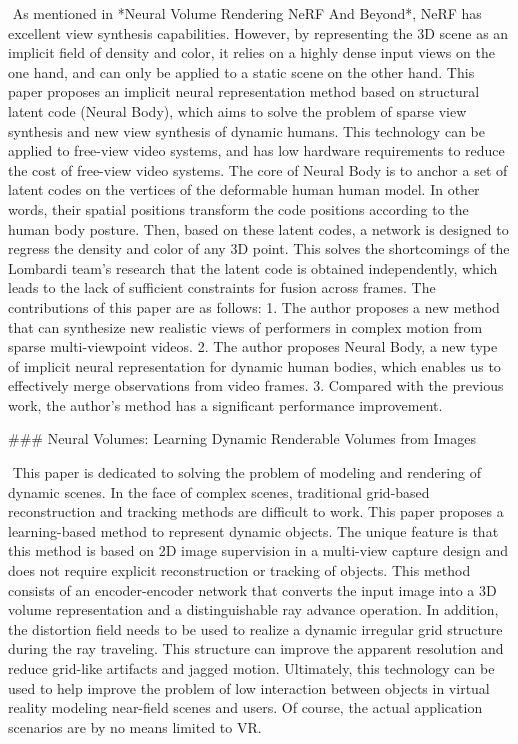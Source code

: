 ​	As mentioned in *Neural Volume Rendering NeRF And Beyond*, NeRF has excellent view synthesis capabilities. However, by representing the 3D scene as an implicit field of density and color, it relies on a highly dense input views on the one hand, and can only be applied to a static scene on the other hand. This paper proposes an implicit neural representation method based on structural latent code (Neural Body), which aims to solve the problem of sparse view synthesis and new view synthesis of dynamic humans. This technology can be applied to free-view video systems, and has low hardware requirements to reduce the cost of free-view video systems. The core of Neural Body is to anchor a set of latent codes on the vertices of the deformable human human model. In other words, their spatial positions transform the code positions according to the human body posture. Then, based on these latent codes, a network is designed to regress the density and color of any 3D point. This solves the shortcomings of the Lombardi team's research that the latent code is obtained independently, which leads to the lack of sufficient constraints for fusion across frames. The contributions of this paper are as follows: 1. The author proposes a new method that can synthesize new realistic views of performers in complex motion from sparse multi-viewpoint videos. 2. The author proposes Neural Body, a new type of implicit neural representation for dynamic human bodies, which enables us to effectively merge observations from video frames. 3. Compared with the previous work, the author's method has a significant performance improvement.



###  Neural Volumes: Learning Dynamic Renderable Volumes from Images

​	This paper is dedicated to solving the problem of modeling and rendering of dynamic scenes. In the face of complex scenes, traditional grid-based reconstruction and tracking methods are difficult to work. This paper proposes a learning-based method to represent dynamic objects. The unique feature is that this method is based on 2D image supervision in a multi-view capture design and does not require explicit reconstruction or tracking of objects. This method consists of an encoder-encoder network that converts the input image into a 3D volume representation and a distinguishable ray advance operation. In addition, the distortion field needs to be used to realize a dynamic irregular grid structure during the ray traveling. This structure can improve the apparent resolution and reduce grid-like artifacts and jagged motion. Ultimately, this technology can be used to help improve the problem of low interaction between objects in virtual reality modeling near-field scenes and users. Of course, the actual application scenarios are by no means limited to VR. 




